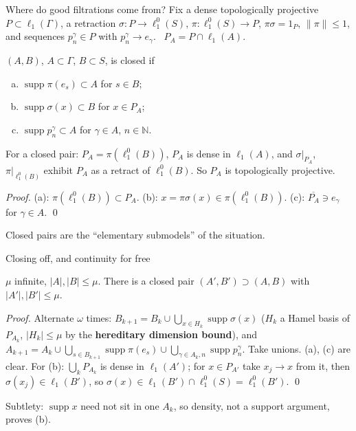 \documentclass[10pt,aspectratio=169]{beamer}
\newcommand{\lo}[1]{\ell_1^0(#1)}
\newcommand{\ellone}[1]{\ell_1(#1)}
\newcommand{\supp}{\operatorname{supp}}
\newcommand{\NN}{\mathbb N}
\begin{document}
\begin{frame}{Where do good filtrations come from?}
  Fix a dense topologically projective $P\subset\ellone\Gamma$, a retraction
  $\sigma\colon P\to\lo S$, $\pi\colon\lo S\to P$, $\pi\sigma=1_P$, $\|\pi\|\le1$,
  and sequences $p^\gamma_n\in P$ with $p^\gamma_n\to e_\gamma$. \ $P_A=P\cap\ellone A$.
  \begin{definition}
    $(A,B)$, $A\subset\Gamma$, $B\subset S$, is \alert{closed} if
    \begin{enumerate}[(a)]
      \item $\supp\pi(e_s)\subset A$ for $s\in B$;
      \item $\supp\sigma(x)\subset B$ for $x\in P_A$;
      \item $\supp p^\gamma_n\subset A$ for $\gamma\in A$, $n\in\NN$.
    \end{enumerate}
  \end{definition}
  \begin{lemma}
    For a closed pair: $P_A=\pi(\lo B)$, $P_A$ is dense in $\ellone A$, and
    $\sigma|_{P_A}$, $\pi|_{\lo B}$ exhibit $P_A$ as a retract of $\lo B$.
    So $P_A$ is topologically projective.
  \end{lemma}
  \textit{Proof.} (a): $\pi(\lo B)\subset P_A$. (b): $x=\pi\sigma(x)\in\pi(\lo B)$.
  (c): $\overline{P_A}\ni e_\gamma$ for $\gamma\in A$. \qed
  \medskip

  Closed pairs are the ``elementary submodels'' of the situation.
\end{frame}

\begin{frame}{Closing off, and continuity for free}
  \begin{lemma}
    $\mu$ infinite, $|A|,|B|\le\mu$. There is a closed pair $(A',B')\supset(A,B)$
    with $|A'|,|B'|\le\mu$.
  \end{lemma}
  \textit{Proof.} Alternate $\omega$ times:
  $B_{k+1}=B_k\cup\bigcup_{x\in H_k}\supp\sigma(x)$ ($H_k$ a Hamel basis of $P_{A_k}$,
  $|H_k|\le\mu$ by the \textbf{hereditary dimension bound}), and
  $A_{k+1}=A_k\cup\bigcup_{s\in B_{k+1}}\supp\pi(e_s)\cup\bigcup_{\gamma\in A_k,n}\supp p^\gamma_n$.
  Take unions. (a), (c) are clear. For (b): $\bigcup_kP_{A_k}$ is dense in
  $\ellone{A'}$; for $x\in P_{A'}$ take $x_j\to x$ from it, then
  $\sigma(x_j)\in\ellone{B'}$, so $\sigma(x)\in\ellone{B'}\cap\lo S=\lo{B'}$. \qed
  \medskip

  Subtlety: $\supp x$ need not sit in one $A_k$, so density, not a support
  argument, proves (b).
\end{frame}
\end{document}
